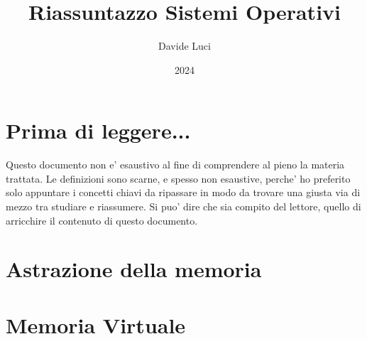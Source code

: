 \documentclass{article}
\title{Riassuntazzo Sistemi Operativi}
\author{Davide Luci}
\date{2024}
\begin{document}
    \maketitle
    \tableofcontents
    \newpage


    \setlength{\parindent}{0pt}
    \section{ Prima di leggere...}
    Questo documento non e' esaustivo al fine di comprendere al pieno la materia trattata.
    Le definizioni sono scarne, e spesso non esaustive, perche' ho preferito solo appuntare i concetti chiavi
    da ripassare in modo da trovare una giusta via di mezzo tra studiare e riassumere. Si puo' dire che sia compito del 
    lettore, quello di arricchire il contenuto di questo documento.

    \section {Astrazione della memoria}
        
    \section {Memoria Virtuale}
        
    
\end{document}
